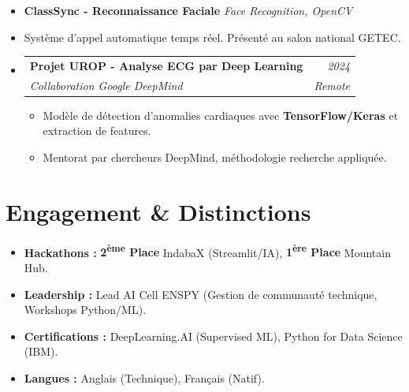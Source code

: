\documentclass[a4paper,11pt]{article}
\makeatletter
\newcommand{\resumeSubheading}[4]{
  \vspace{-1pt}\item
    \begin{tabular*}{0.97\textwidth}[t]{l@{\extracolsep{\fill}}r}
      \textbf{#1} & \textit{\small #2} \\
      \textit{\small #3} & \textit{\small #4} \\
    \end{tabular*}\vspace{-5pt}
}
\makeatother
\begin{document}
\begin{itemize}[leftmargin=*, label={}]
    \item \textbf{ClassSync - Reconnaissance Faciale} \hfill \textit{Face Recognition, OpenCV}
    \vspace{-2pt}
    \item \small{Système d'appel automatique temps réel. Présenté au salon national GETEC.}
    \vspace{1pt}
        \resumeSubheading
      {Projet UROP - Analyse ECG par Deep Learning}{2024}
      {Collaboration Google DeepMind}{Remote}
      \begin{itemize}[leftmargin=0.4cm, nosep, label=\tiny$\bullet$]
        \item \small{Modèle de détection d'anomalies cardiaques avec \textbf{TensorFlow/Keras} et extraction de features.}
        \item \small{Mentorat par chercheurs DeepMind, méthodologie recherche appliquée.}
      \end{itemize}
    \vspace{2pt}

\end{itemize}

\section{Engagement & Distinctions}
\begin{itemize}[leftmargin=*, nosep]
    \item \textbf{Hackathons :} \textbf{2\textsuperscript{ème} Place} IndabaX (Streamlit/IA), \textbf{1\textsuperscript{ère} Place} Mountain Hub.
    \item \textbf{Leadership :} Lead AI Cell ENSPY (Gestion de communauté technique, Workshops Python/ML).
    \item \textbf{Certifications :} DeepLearning.AI (Supervised ML), Python for Data Science (IBM).
    \item \textbf{Langues :} Anglais (Technique), Français (Natif).
\end{itemize}
\end{document}
